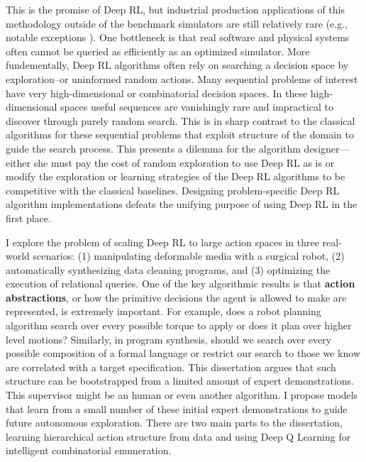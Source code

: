 This is the promise of Deep RL, but industrial production applications of this methodology outside of the benchmark simulators are still relatively rare (e.g., notable exceptions \cite{mirhoseini2017device}). One bottleneck is that real software and physical systems often cannot be queried as efficiently as an optimized simulator. 
More fundementally, Deep RL algorithms often rely on searching a decision space by exploration--or uninformed random actions. Many sequential problems of interest have very high-dimensional or combinatorial decision spaces. In these high-dimensional spaces useful sequences are vanishingly rare and impractical to discover through purely random search. This is in sharp contrast to the classical algorithms for these sequential problems that exploit structure of the domain to guide the search process. This presents a dilemma for the algorithm designer---either she must pay the cost of random exploration to use Deep RL as is or modify the exploration or learning strategies of the Deep RL algorithms to be competitive with the classical baselines. Designing problem-specific Deep RL algorithm implementations defeats the unifying purpose of using Deep RL in the first place.

I explore the problem of scaling Deep RL to large action spaces in three real-world scenarios: (1) manipulating deformable media with a surgical robot, (2) automatically synthesizing data cleaning programs, and (3) optimizing the execution of relational queries. One of the key algorithmic results is that \textbf{action abstractions}, or how the primitive decisions the agent is allowed to make are represented, is extremely important. For example, does a robot planning algorithm search over every possible torque to apply or does it plan over higher level motions? Similarly, in program synthesis, should we search over every possible composition of a formal language or restrict our search to those we know are correlated with a target specification. This dissertation argues that such structure can be bootstrapped from a limited amount of expert demonstrations. This supervisor might be an human or even another algorithm. I propose models that learn from a small number of these initial expert demonstrations to guide future autonomous exploration. 
There are two main parts to the dissertation, learning hierarchical action structure from data and using Deep Q Learning for intelligent combinatorial enumeration. 







